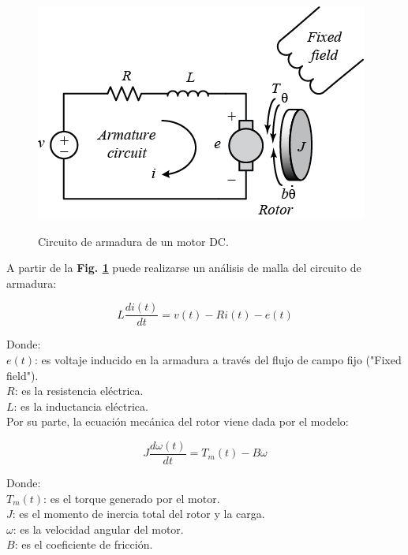 \begin{figure}[h]
	\begin{center}
		\includegraphics[scale=1.5]{imagenes/modelo_dinamico/motor.PNG}\\
	\end{center}
	\caption{Circuito de armadura de un motor DC.}
	\label{fig:motordc}
	\textit{}
\end{figure}

A partir de la \textbf{Fig. \ref{fig:motordc}} puede realizarse un análisis de malla del circuito de armadura:

\begin{equation}\label{eq:armadura}
	L\frac{di(t)}{dt} =v(t) -Ri(t) -e(t)
\end{equation}

\noindent Donde:\\
 $e(t)$: es voltaje inducido en la armadura a través del flujo de campo fijo ("Fixed field").\\
 $R$: es la resistencia eléctrica.\\
 $L$: es la inductancia eléctrica.\\ 
 
 Por su parte, la ecuación mecánica del rotor viene dada por el modelo:

\begin{equation}\label{eq:torque_dc}
	J\frac{d\omega(t)}{dt} = T_{m}(t)-B\omega
\end{equation}

\noindent Donde:\\
$T_{m}(t)$: es el torque generado por el motor.\\
$J$: es el momento de inercia total del rotor y la carga.\\
$\omega$: es la velocidad angular del motor.\\ 
$B$: es el coeficiente de fricción.\\ 

